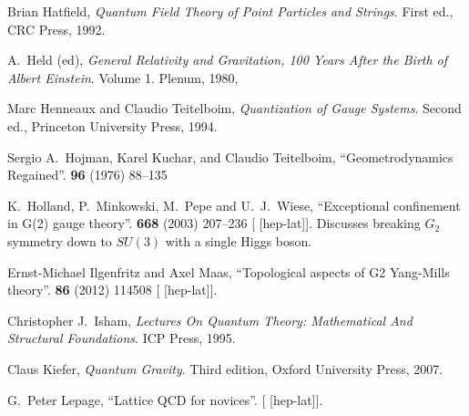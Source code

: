 \begin{thebibliography}{99}
Brian Hatfield,
\textit{Quantum Field Theory of Point Particles and Strings}.
First ed., CRC Press, 1992.

A.~Held (ed),
\textit{General Relativity and Gravitation, 100 Years After the Birth of Albert Einstein}.
Volume 1.
Plenum, 1980,

Marc Henneaux and Claudio Teitelboim,
\textit{Quantization of Gauge Systems}.
Second ed., Princeton University Press, 1994.

Sergio A.~Hojman, Karel Kuchar, and Claudio Teitelboim,
``Geometrodynamics Regained''.
 \textbf{96} (1976) 88--135
{\tt{}}

K.~Holland, P.~Minkowski, M.~Pepe and U.~J.~Wiese,
``Exceptional confinement in G(2) gauge theory''.
 \textbf{668} (2003) 207--236
{\tt{}}
[ [hep-lat]].
Discusses breaking $G_{2}$ symmetry down to $SU(3)$ with a single Higgs boson.

Ernst-Michael Ilgenfritz and Axel Maas,
``Topological aspects of G2 Yang-Mills theory''.
 \textbf{86} (2012) 114508
{\tt{}}
[ [hep-lat]].

Christopher J.\ Isham,
\textit{Lectures On Quantum Theory: Mathematical And Structural Foundations}.
ICP Press, 1995.


Claus Kiefer,
\textit{Quantum Gravity}.
Third edition, Oxford University Press, 2007.



G.~Peter Lepage,
``Lattice QCD for novices''.
[ [hep-lat]].


\end{thebibliography}
